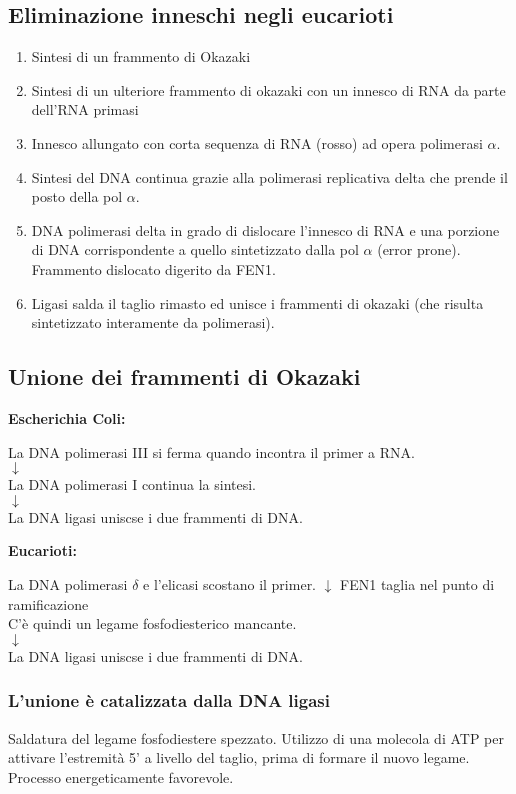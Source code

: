 \documentclass{article}
\begin{document}
\subsection{Eliminazione inneschi negli eucarioti}
\begin{enumerate}
    \item Sintesi di un frammento di Okazaki
    \item Sintesi di un ulteriore frammento di okazaki con un innesco di RNA da parte dell'RNA primasi
    \item Innesco allungato con corta sequenza di RNA (rosso) ad opera polimerasi $ \alpha $.
    \item Sintesi del DNA continua grazie alla polimerasi replicativa delta che prende il posto della pol $ \alpha $.
    \item DNA polimerasi delta in grado di dislocare l'innesco di RNA e una porzione di DNA corrispondente a quello sintetizzato dalla pol $ \alpha $ (error prone). Frammento dislocato digerito da FEN1.
    \item Ligasi salda il taglio rimasto ed unisce i frammenti di okazaki (che risulta sintetizzato interamente da polimerasi).
\end{enumerate} 
\subsection{Unione dei frammenti di Okazaki} 
\textbf{Escherichia Coli:}
\begin{center}
    La DNA polimerasi III si ferma quando incontra il primer a RNA.\\
    $ \downarrow $ \\La DNA polimerasi I continua la sintesi.\\
    $ \downarrow $ \\La DNA ligasi uniscse i due frammenti di DNA.\\     
\end{center}
\textbf{Eucarioti:}
\begin{center}
    La DNA polimerasi $ \delta $ e l'elicasi scostano il primer. $ \downarrow $ FEN1 taglia nel punto di ramificazione\\
    C'è quindi un legame fosfodiesterico mancante.\\
    $ \downarrow $ \\La DNA ligasi uniscse i due frammenti di DNA.\\     
\end{center}
\subsubsection{L'unione è catalizzata dalla DNA ligasi} Saldatura del legame fosfodiestere spezzato. Utilizzo di una molecola di ATP per attivare l'estremità 5' a livello del taglio, prima di formare il nuovo legame. Processo energeticamente favorevole.
\end{document}
